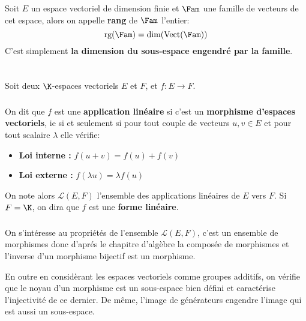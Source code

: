 \subsection*{}
Soit \(E\) un espace vectoriel de dimension finie et \(\Fam\) une famille de vecteurs de cet espace, alors on appelle \textbf{rang} de \(\Fam\) l'entier:
\[ 
   \text{rg}(\Fam) = \text{dim}(\text{Vect}(\Fam))
\]
C'est simplement \textbf{la dimension du sous-espace engendré par la famille}.
\chapter*{} %

Soit deux \(\K\)-espaces vectoriels \(E\) et \(F\), et \(f : E \longrightarrow F \).

\subsection*{}

On dit que \(f\) est une \textbf{application linéaire} si c'est un \textbf{morphisme d'espaces vectoriels}, ie si et seulement si pour tout couple de vecteurs \(u, v \in E\) et pour tout scalaire \(\lambda\) elle vérifie: 
\begin{itemize}
   \item \textbf{ Loi  interne : } \( f(u + v) = f(u) + f(v) \)
   \item \textbf{ Loi  externe : } \( f(\lambda u) = \lambda f(u) \)
\end{itemize}
On note alors \(\mathcal{L}(E, F)\) l'ensemble des applications linéaires de \(E\) vers \(F\). Si \( F = \K \), on dira que \( f \) est une \textbf{forme linéaire}.
\subsection*{}

On s'intéresse au propriétés de l'ensemble \(\mathcal{L}(E, F)\), c'est un ensemble de morphismes donc d'aprés le chapitre d'algèbre la composée de morphismes et l'inverse d'un morphisme bijectif est un morphisme.\<

En outre en considèrant les espaces vectoriels comme groupes additifs, on vérifie que le noyau d'un morphisme est un sous-espace bien défini et caractérise l'injectivité de ce dernier. De même, l'image de générateurs engendre l'image qui est aussi un sous-espace.
